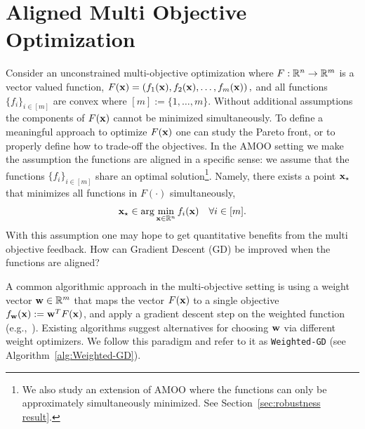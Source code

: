 
\section{Aligned Multi Objective Optimization}\label{sec:AMOO setting}




Consider an unconstrained multi-objective optimization where
 $F: \mathbb{R}^{n} \to \mathbb{R}^m$ is a vector valued function, 
 $
 F({\mathbf{x}}) = \left(f_1({\mathbf{x}}), f_2({\mathbf{x}}), \ldots, f_m({\mathbf{x}}) \right),
 $
 and all functions $\{ f_i\}_{i\in [m]}$ are convex where $[m]:=\{1,\ldots,m\}$.
Without additional assumptions the components of $F({\mathbf{x}})$ cannot be minimized simultaneously. To define a meaningful approach to optimize $F({\mathbf{x}})$ one can study the Pareto front, or to properly define how to trade-off the objectives. In the AMOO setting we make the assumption the functions are aligned in a specific sense: we assume that the functions $\{ f_i\}_{i\in [m]}$ share an optimal solution\footnote{We also study an extension of AMOO where the functions can only be approximately simultaneously minimized. See Section~\ref{sec:robustness result}.}. Namely, there exists a point ${\mathbf{x}}_\star$ that minimizes all functions in $F(\cdot)$ simultaneously,
\begin{align}
    {\mathbf{x}}_\star \in \arg\min_{{\mathbf{x}}\in \mathbb{R}^n} f_i({\mathbf{x}}) \quad \forall i \in [m]. \label{eq:aligned_functions}
\end{align}
With this assumption one may hope to get quantitative benefits from the multi objective feedback. 
How can Gradient Descent (GD) be improved when the functions are aligned? 






A common algorithmic approach in the multi-objective setting is using a weight vector ${\mathbf{w}}\in \mathbb{R}^m$ that maps the vector $F({\mathbf{x}})$ to a single objective $f_{{\mathbf{w}}}({\mathbf{x}}) := {\mathbf{w}}^T F({\mathbf{x}})$, and apply a gradient descent step on the weighted function (e.g.,~\citet{sener2018multi, yu2020gradient, liu2021conflict}). Existing algorithms suggest alternatives for choosing ${\mathbf{w}}$ via different weight optimizers. We follow this paradigm and refer to it as \texttt{Weighted-GD} (see Algorithm~\ref{alg:Weighted-GD}).



